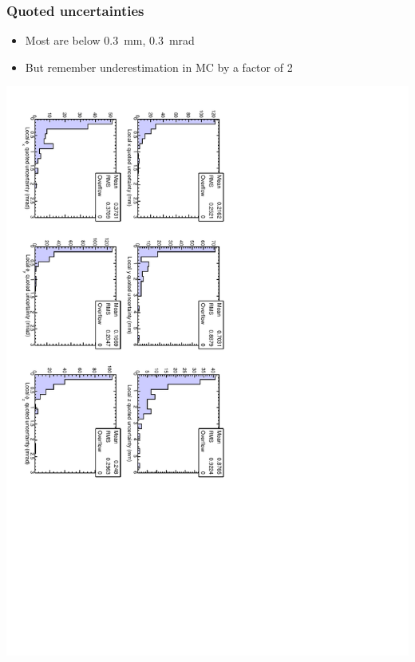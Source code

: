 \documentclass[compress]{beamer}
\begin{document}
\begin{frame}
\frametitle{Quoted uncertainties}

\begin{itemize}
\item Most are below 0.3~mm, 0.3~mrad
\item But remember underestimation in MC by a factor of 2
\end{itemize}

\vfill
\includegraphics[height=\linewidth, angle=90]{data_quoted_uncertainty.pdf}
\end{frame}
\end{document}
